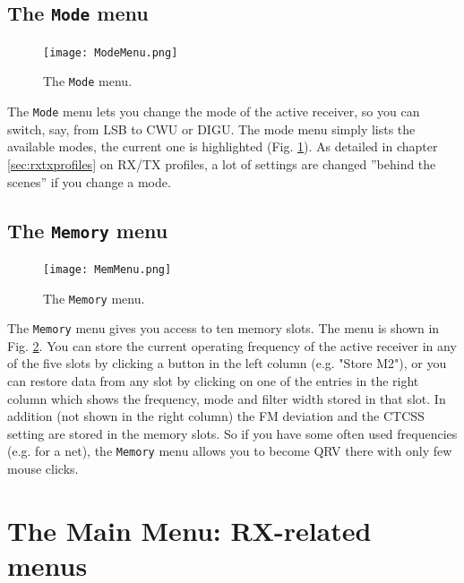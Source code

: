 \documentclass[12pt]{book}
\def\bltt#1{\texttt{\color{blue}#1}}
\begin{document}
\section{The \texttt{Mode} menu}
\begin{figure}[ht]
\center
\texttt{[image: ModeMenu.png]}
\caption{The \bltt{Mode} menu.}
\label{fig:ModeMenu}
\end{figure}

The \bltt{Mode} menu lets you change the mode of the active receiver, so you can switch,
say, from LSB to CWU or DIGU. The mode menu simply lists the available modes, the current
one is highlighted (Fig. \ref{fig:ModeMenu}). As detailed in chapter \ref{sec:rxtxprofiles}
on RX/TX profiles,
a lot of settings are changed ''behind the scenes'' if you change a mode.

\section{The \texttt{Memory}  menu}
\label{sec:memmenu}

\begin{figure}[ht]
\center
\texttt{[image: MemMenu.png]}
\caption{The \bltt{Memory} menu.}
\label{fig:MemMenu}
\end{figure}

The \bltt{Memory} menu gives you access to ten memory slots. The menu is shown in Fig. \ref{fig:MemMenu}.
You can store the current
operating frequency  of the active receiver in any of the five slots by clicking a
button in the left column (e.g. "Store M2"), or you can restore
data from any slot by clicking on one of the entries in the right column
which shows the frequency, mode and filter width stored in that slot.
In addition (not shown in the right column) the FM deviation and the CTCSS setting are stored
in the memory slots.
So if you have some often used frequencies (e.g. for a net), the
\bltt{Memory} menu allows you to become QRV there with only few mouse clicks.


\chapter[RX-related menus]{The Main Menu: RX-related menus}
\end{document}
